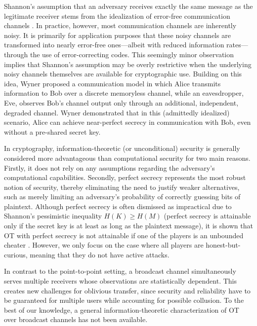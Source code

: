 \documentclass[runningheads]{llncs}
\newcommand{\parbreak}{ \vspace{0.3 em}}
\begin{document}
\parbreak
\parbreak
Shannon’s assumption that an adversary receives exactly the same message as the legitimate receiver stems from the idealization of error-free communication channels \cite{Shannon}. In practice, however, most communication channels are inherently noisy. It is primarily for application purposes that these noisy channels are transformed into nearly error-free ones—albeit with reduced information rates—through the use of error-correcting codes. This seemingly minor observation implies that Shannon’s assumption may be overly restrictive when the underlying noisy channels themselves are available for cryptographic use. Building on this idea, Wyner \cite{Wyner} proposed a communication model in which Alice transmits information to Bob over a discrete memoryless channel, while an eavesdropper, Eve, observes Bob’s channel output only through an additional, independent, degraded channel. Wyner demonstrated that in this (admittedly idealized) scenario, Alice can achieve near-perfect secrecy in communication with Bob, even without a pre-shared secret key.

\parbreak
In cryptography, information-theoretic (or unconditional) security is generally considered more advantageous than computational security for two main reasons. Firstly, it does not rely on any assumptions regarding the adversary’s computational capabilities. Secondly, perfect secrecy represents the most robust notion of security, thereby eliminating the need to justify weaker alternatives, such as merely limiting an adversary’s probability of correctly guessing bits of plaintext. Although perfect secrecy is often dismissed as impractical due to Shannon’s pessimistic inequality $H(K)\geq H(M)$ (perfect secrecy is attainable only if the secret key is at least as long as the plaintext message), it is shown that OT with perfect secrecy is not attainable if one of the players is an unbounded cheater \cite{Hadi-limit}. However, we only focus on the case where all players are honest-but-curious, meaning that they do not have active attacks.

In contrast to the point-to-point setting, a broadcast channel simultaneously serves multiple receivers whose observations are statistically dependent. This creates new challenges for oblivious transfer, since security and reliability have to be guaranteed for multiple users while accounting for possible collusion. To the best of our knowledge, a general information-theoretic characterization of OT over broadcast channels has not been available.
\end{document}
